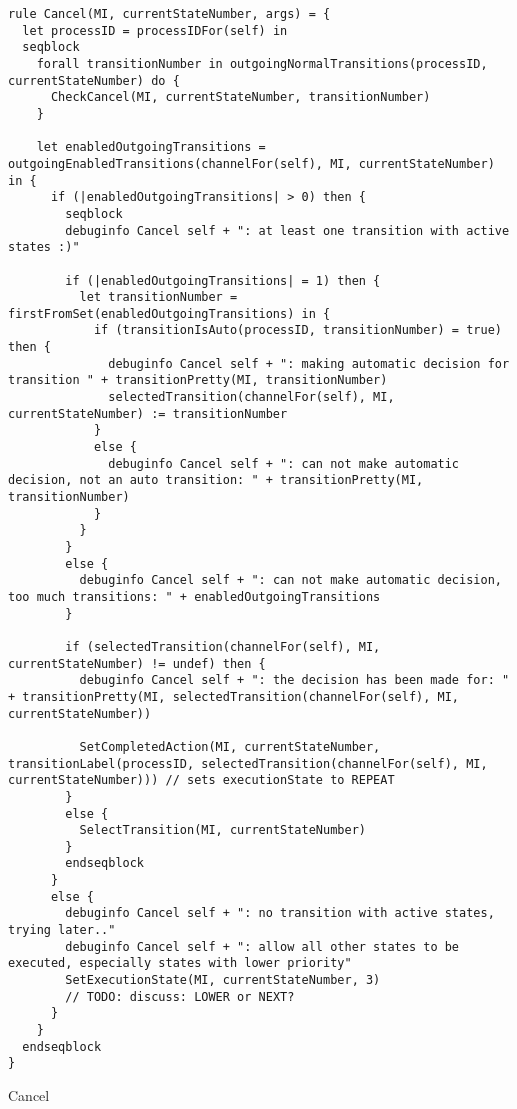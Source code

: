 \begin{listing}[H]
\begin{verbatim}
rule Cancel(MI, currentStateNumber, args) = {
  let processID = processIDFor(self) in
  seqblock
    forall transitionNumber in outgoingNormalTransitions(processID, currentStateNumber) do {
      CheckCancel(MI, currentStateNumber, transitionNumber)
    }

    let enabledOutgoingTransitions = outgoingEnabledTransitions(channelFor(self), MI, currentStateNumber) in {
      if (|enabledOutgoingTransitions| > 0) then {
        seqblock
        debuginfo Cancel self + ": at least one transition with active states :)"

        if (|enabledOutgoingTransitions| = 1) then {
          let transitionNumber = firstFromSet(enabledOutgoingTransitions) in {
            if (transitionIsAuto(processID, transitionNumber) = true) then {
              debuginfo Cancel self + ": making automatic decision for transition " + transitionPretty(MI, transitionNumber)
              selectedTransition(channelFor(self), MI, currentStateNumber) := transitionNumber
            }
            else {
              debuginfo Cancel self + ": can not make automatic decision, not an auto transition: " + transitionPretty(MI, transitionNumber)
            }
          }
        }
        else {
          debuginfo Cancel self + ": can not make automatic decision, too much transitions: " + enabledOutgoingTransitions
        }

        if (selectedTransition(channelFor(self), MI, currentStateNumber) != undef) then {
          debuginfo Cancel self + ": the decision has been made for: " + transitionPretty(MI, selectedTransition(channelFor(self), MI, currentStateNumber))

          SetCompletedAction(MI, currentStateNumber, transitionLabel(processID, selectedTransition(channelFor(self), MI, currentStateNumber))) // sets executionState to REPEAT
        }
        else {
          SelectTransition(MI, currentStateNumber)
        }
        endseqblock
      }
      else {
        debuginfo Cancel self + ": no transition with active states, trying later.."
        debuginfo Cancel self + ": allow all other states to be executed, especially states with lower priority"
        SetExecutionState(MI, currentStateNumber, 3)
        // TODO: discuss: LOWER or NEXT?
      }
    }
  endseqblock
}
\end{verbatim}
\caption{Cancel}
\label{lst:asm:Cancel}
\end{listing}




